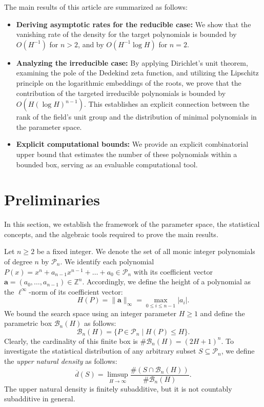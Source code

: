 \documentclass[11pt,a4paper]{article}
\newcommand{\Z}{\mathbb{Z}}
\begin{document}
The main results of this article are summarized as follows:
\begin{itemize}
    \item \textbf{Deriving asymptotic rates for the reducible case:} We show that the vanishing rate of the density for the target polynomials is bounded by $O(H^{-1})$ for $n > 2$, and by $O(H^{-1}\log H)$ for $n = 2$.
    \item \textbf{Analyzing the irreducible case:} By applying Dirichlet's unit theorem, examining the pole of the Dedekind zeta function, and utilizing the Lipschitz principle on the logarithmic embeddings of the roots, we prove that the contribution of the targeted irreducible polynomials is bounded by $O(H(\log H)^{n-1})$. This establishes an explicit connection between the rank of the field's unit group and the distribution of minimal polynomials in the parameter space.
    \item \textbf{Explicit computational bounds:} We provide an explicit combinatorial upper bound that estimates the number of these polynomials within a bounded box, serving as an evaluable computational tool.
\end{itemize}
\section{Preliminaries}
In this section, we establish the framework of the parameter space, the statistical concepts, and the algebraic tools required to prove the main results.

Let $n \ge 2$ be a fixed integer. We denote the set of all monic integer polynomials of degree $n$ by $\mathcal{P}_n$. We identify each polynomial $P(x) = x^n + a_{n-1}x^{n-1} + \dots + a_0 \in \mathcal{P}_n$ with its coefficient vector $\boldsymbol{a} = (a_0, \dots, a_{n-1}) \in \Z^n$. Accordingly, we define the height of a polynomial as the $\ell^\infty$-norm of its coefficient vector:
\begin{equation*}
    H(P) = \|\boldsymbol{a}\|_\infty = \max_{0 \le i \le n-1} |a_i|.
\end{equation*}
We bound the search space using an integer parameter $H \ge 1$ and define the parametric box $\mathcal{B}_n(H)$ as follows:
\begin{equation*}
    \mathcal{B}_n(H) = \{ P \in \mathcal{P}_n \mid H(P) \le H \}.
\end{equation*}
Clearly, the cardinality of this finite box is $\#\mathcal{B}_n(H) = (2H + 1)^n$. To investigate the statistical distribution of any arbitrary subset $S \subseteq \mathcal{P}_n$, we define the \textit{upper natural density} as follows:
\begin{equation*}
    \overline{d}(S) = \limsup_{H \to \infty} \frac{\#(S \cap \mathcal{B}_n(H))}{\#\mathcal{B}_n(H)}.
\end{equation*}
The upper natural density is finitely subadditive, but it is not countably subadditive in general.
\end{document}
